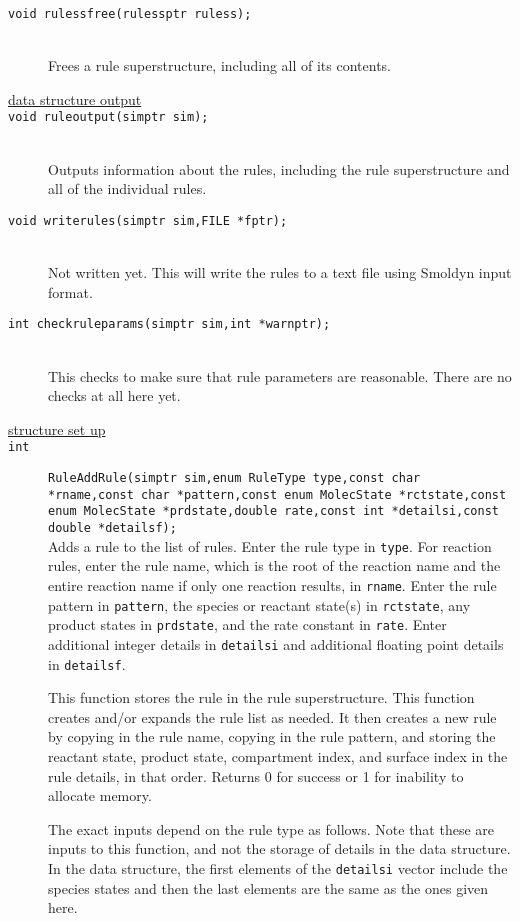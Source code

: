 \documentclass {book}
\newcommand {\ttt} {\texttt}
\begin{document}
\begin{description}
\item[\ttt{void rulessfree(rulessptr ruless);}]
\hfill \\
Frees a rule superstructure, including all of its contents.

\item[\underline{data structure output}]

\item[\ttt{void ruleoutput(simptr sim);}]
\hfill \\
Outputs information about the rules, including the rule superstructure and all of the individual rules.

\item[\ttt{void writerules(simptr sim,FILE *fptr);}]
\hfill \\
Not written yet. This will write the rules to a text file using Smoldyn input format.

\item[\ttt{int checkruleparams(simptr sim,int *warnptr);}]
\hfill \\
This checks to make sure that rule parameters are reasonable. There are no checks at all here yet.

\item[\underline{structure set up}]

\item[\ttt{int}]
\ttt{RuleAddRule(simptr sim,enum RuleType type,const char *rname,const char *pattern,const enum MolecState *rctstate,const enum MolecState *prdstate,double rate,const int *detailsi,const double *detailsf);}
\hfill \\
Adds a rule to the list of rules. Enter the rule type in \ttt{type}. For reaction rules, enter the rule name, which is the root of the reaction name and the entire reaction name if only one reaction results, in \ttt{rname}. Enter the rule pattern in \ttt{pattern}, the species or reactant state(s) in \ttt{rctstate}, any product states in \ttt{prdstate}, and the rate constant in \ttt{rate}. Enter additional integer details in \ttt{detailsi} and additional floating point details in \ttt{detailsf}.

This function stores the rule in the rule superstructure. This function creates and/or expands the rule list as needed. It then creates a new rule by copying in the rule name, copying in the rule pattern, and storing the reactant state, product state, compartment index, and surface index in the rule details, in that order. Returns 0 for success or 1 for inability to allocate memory.

The exact inputs depend on the rule type as follows. Note that these are inputs to this function, and not the storage of details in the data structure. In the data structure, the first elements of the \ttt{detailsi} vector include the species states and then the last elements are the same as the ones given here.


\end{description}
\end{document}
